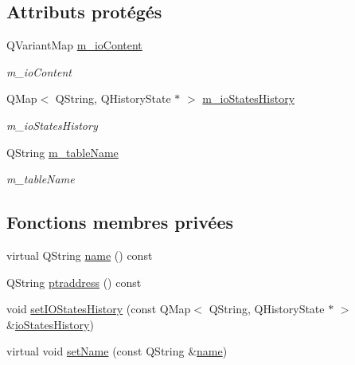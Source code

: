 \subsection*{Attributs protégés}
\begin{DoxyCompactItemize}
\item 
Q\-Variant\-Map \hyperlink{classSH__InOutStateMachine_a661a1c7bd3b1086b3b5cd60ca957ecbd}{m\-\_\-io\-Content}
\begin{DoxyCompactList}\small\item\em m\-\_\-io\-Content \end{DoxyCompactList}\item 
Q\-Map$<$ Q\-String, Q\-History\-State $\ast$ $>$ \hyperlink{classSH__InOutStateMachine_aaca2ea542b3f5b4cd238396b07492455}{m\-\_\-io\-States\-History}
\begin{DoxyCompactList}\small\item\em m\-\_\-io\-States\-History \end{DoxyCompactList}\item 
Q\-String \hyperlink{classSH__InOutStateMachine_acc0f5d5133af2dcca30939f53ec8837b}{m\-\_\-table\-Name}
\begin{DoxyCompactList}\small\item\em m\-\_\-table\-Name \end{DoxyCompactList}\end{DoxyCompactItemize}
\subsection*{Fonctions membres privées}
\begin{DoxyCompactItemize}
\item 
virtual Q\-String \hyperlink{classSH__NamedObject_a970f265df31b28b2179bbbceb6170ac2}{name} () const 
\item 
Q\-String \hyperlink{classSH__NamedObject_a98806c492b55a54d01330bbecce5118b}{ptraddress} () const 
\item 
void \hyperlink{classSH__InOutStateMachine_ab35839e7880506286ebb5a11c2a924c2}{set\-I\-O\-States\-History} (const Q\-Map$<$ Q\-String, Q\-History\-State $\ast$ $>$ \&\hyperlink{classSH__InOutStateMachine_a4ec3ebb4c40ea57c63afdf5976e62a94}{io\-States\-History})
\item 
virtual void \hyperlink{classSH__NamedObject_a18e1860b747e029eefa140f8324bb503}{set\-Name} (const Q\-String \&\hyperlink{classSH__NamedObject_a970f265df31b28b2179bbbceb6170ac2}{name})
\end{DoxyCompactItemize}


